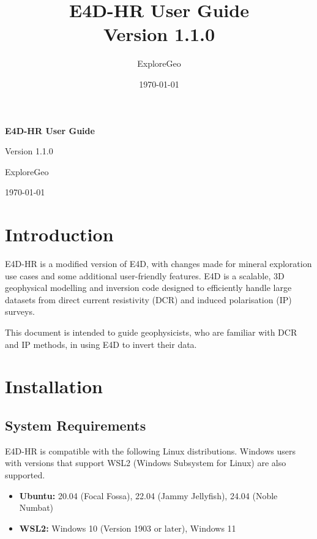 \documentclass[a4paper,12pt]{article}
\title{E4D-HR User Guide\\[0.5em]\large Version 1.1.0}
\author{ExploreGeo}
\date{\today}
\begin{document}
\begin{titlepage}
    \centering
    \vspace*{2cm}
    
    {\Huge\bfseries E4D-HR User Guide}
    
    \vspace{0.5em}
    
    {\Large Version 1.1.0}
    
    \vfill
    
    {\large ExploreGeo}
    
    \vspace{1em}
    
    {\large \today}
    
    \vspace{1cm}
\end{titlepage}

\newpage

\tableofcontents

\newpage

\section{Introduction}

E4D-HR is a modified version of E4D, with changes made for mineral exploration
use cases and some additional user-friendly features. E4D is a scalable, 3D
geophysical modelling and inversion code designed to efficiently handle large
datasets from direct current resistivity (DCR) and induced polarisation (IP)
surveys.

This document is intended to guide geophysicists, who are familiar with DCR and
IP methods, in using E4D to invert their data.

\section{Installation}

\subsection{System Requirements}

E4D-HR is compatible with the following Linux distributions. Windows users with
versions that support WSL2 (Windows Subsystem for Linux) are also supported.

\begin{itemize}
    \item \textbf{Ubuntu:} 20.04 (Focal Fossa), 22.04 (Jammy Jellyfish), 24.04 (Noble Numbat)
    \item \textbf{WSL2:} Windows 10 (Version 1903 or later), Windows 11
\end{itemize}
\end{document}
